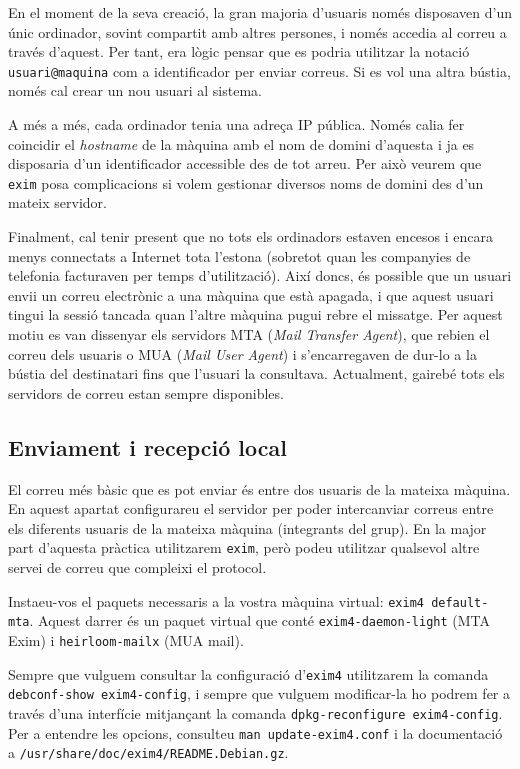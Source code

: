 \documentclass{practicaitic}
\begin{document}
En el moment de la seva creació, la gran majoria d'usuaris només disposaven
d'un únic ordinador, sovint compartit amb altres persones, i només accedia
al correu a través d'aquest. Per tant, era lògic pensar que es podria
utilitzar la notació \texttt{usuari@maquina} com a identificador
per enviar correus. Si es vol una altra bústia, només cal crear un
nou usuari al sistema.

A més a més, cada ordinador tenia una adreça IP pública. Només calia
fer coincidir el \textit{hostname} de la màquina amb el nom de domini
d'aquesta i ja es disposaria d'un identificador accessible des de tot
arreu. Per això veurem que \texttt{exim} posa complicacions si volem
gestionar diversos noms de domini des d'un mateix servidor.

Finalment, cal tenir present que no tots els ordinadors estaven
encesos i encara menys connectats a Internet tota l'estona (sobretot
quan les companyies de telefonia facturaven per temps d'utilització).
Així doncs, és possible que un usuari envii un correu electrònic a una
màquina que està apagada, i que aquest usuari tingui la sessió tancada
quan l'altre màquina pugui rebre el missatge. Per aquest motiu es van
dissenyar els servidors MTA (\textit{Mail Transfer Agent}), que rebien
el correu dels usuaris o MUA (\textit{Mail User Agent}) i
s'encarregaven de dur-lo a la bústia del destinatari fins que l'usuari
la consultava. Actualment, gairebé tots els servidors de correu estan
sempre disponibles.

\subsection{Enviament i recepció local}

El correu més bàsic que es pot enviar és entre dos usuaris de la
mateixa màquina. En aquest apartat configurareu el servidor per poder
intercanviar correus entre els diferents usuaris de la mateixa màquina
(integrants del grup). En la major part d'aquesta pràctica utilitzarem
\texttt{exim}, però podeu utilitzar qualsevol altre servei de correu
que compleixi el protocol.

\begin{previ}
  Insta\lgem eu-vos el paquets necessaris a la vostra màquina virtual:
  \texttt{exim4 default-mta}. Aquest darrer és un paquet virtual que
  conté \texttt{exim4-daemon-light} (MTA Exim) i \texttt{heirloom-mailx}
  (MUA mail).
\end{previ}

Sempre que vulguem consultar la configuració d'\texttt{exim4} utilitzarem la
comanda \texttt{debconf-show exim4-config}, i sempre que vulguem modificar-la
ho podrem fer a través d'una interfície mitjançant la comanda
\texttt{dpkg-reconfigure exim4-config}. Per a entendre les opcions,
consulteu \texttt{man update-exim4.conf} i la documentació a
\texttt{/usr/share/doc/exim4/README.Debian.gz}.
\end{document}
